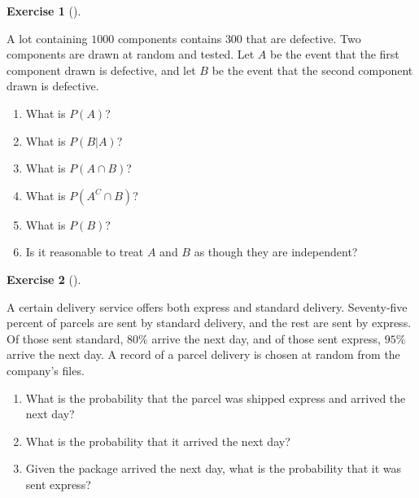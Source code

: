 \documentclass[
  letterpaper,
  DIV=11,
  numbers=noendperiod]{scrreprt}
\providecommand{\tightlist}{%
  \setlength{\itemsep}{0pt}\setlength{\parskip}{0pt}}\usepackage{longtable,booktabs,array}
\theoremstyle{definition}
\newtheorem{exercise}{Exercise}[chapter]
\theoremstyle{definition}
\theoremstyle{definition}
\theoremstyle{remark}
\begin{document}
\begin{exercise}[]\protect\hypertarget{exr-4.9}{}\label{exr-4.9}

A lot containing \(1000\) components contains \(300\) that are
defective. Two components are drawn at random and tested. Let \(A\) be
the event that the first component drawn is defective, and let \(B\) be
the event that the second component drawn is defective.

\begin{enumerate}
\def\labelenumi{\alph{enumi}.}
\tightlist
\item
  What is \(P(A)\)?
\item
  What is \(P(B|A)\)?
\item
  What is \(P(A \cap B)\)?
\item
  What is \(P(A^C \cap B)\)?
\item
  What is \(P(B)\)?
\item
  Is it reasonable to treat \(A\) and \(B\) as though they are
  independent?
\end{enumerate}

\end{exercise}

\begin{exercise}[]\protect\hypertarget{exr-4.10}{}\label{exr-4.10}

A certain delivery service offers both express and standard delivery.
Seventy-five percent of parcels are sent by standard delivery, and the
rest are sent by express. Of those sent standard, \(80\%\) arrive the
next day, and of those sent express, \(95\%\) arrive the next day. A
record of a parcel delivery is chosen at random from the company's
files.

\begin{enumerate}
\def\labelenumi{\alph{enumi}.}
\tightlist
\item
  What is the probability that the parcel was shipped express and
  arrived the next day?
\item
  What is the probability that it arrived the next day?
\item
  Given the package arrived the next day, what is the probability that
  it was sent express?
\end{enumerate}

\end{exercise}
\end{document}
